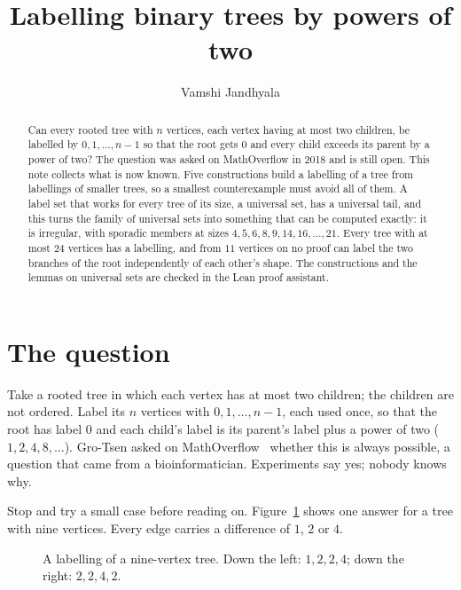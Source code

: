 \documentclass[11pt]{article}
\title{Labelling binary trees by powers of two}
\author{Vamshi Jandhyala}
\date{}
\theoremstyle{remark}
\begin{document}
\maketitle
\vspace{-2em}

\begin{abstract}
Can every rooted tree with $n$ vertices, each vertex having at most two children, be labelled
by $0,1,\dots,n-1$ so that the root gets $0$ and every child exceeds its parent by a power of
two? The question was asked on MathOverflow in 2018 and is still open. This note collects what
is now known. Five constructions build a labelling of a tree from labellings of smaller trees,
so a smallest counterexample must avoid all of them. A label set that works for every tree of
its size, a universal set, has a universal tail, and this turns the family of universal sets
into something that can be computed exactly: it is irregular, with sporadic members at sizes
$4,5,6,8,9,14,16,\dots,21$. Every tree with at most $24$ vertices has a labelling, and from
$11$ vertices on no proof can label the two branches of the root independently of each other's
shape. The constructions and the lemmas on universal sets are checked in the Lean proof
assistant.
\end{abstract}

\section{The question}

Take a rooted tree in which each vertex has at most two children; the children are not ordered.
Label its $n$ vertices with $0,1,\dots,n-1$, each used once, so that the root has label $0$ and
each child's label is its parent's label plus a power of two ($1,2,4,8,\dots$). Gro-Tsen asked
on MathOverflow~\cite{MO} whether this is always possible, a question that came from a
bioinformatician. Experiments say yes; nobody knows why.

Stop and try a small case before reading on. Figure~\ref{fig:example} shows one answer for a tree
with nine vertices. Every edge carries a difference of $1$, $2$ or $4$.

\begin{figure}[ht]
\centering
{}
\caption{A labelling of a nine-vertex tree. Down the left: $1,2,2,4$; down the right: $2,2,4,2$.}
\label{fig:example}
\end{figure}
\end{document}
